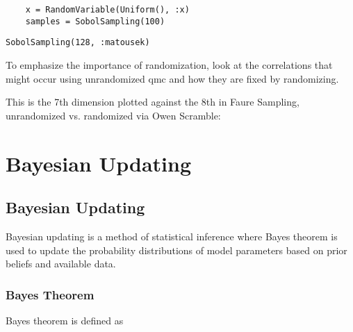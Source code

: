 \begin{verbatim}
    x = RandomVariable(Uniform(), :x)
    samples = SobolSampling(100)
\end{verbatim}


\begin{verbatim}
SobolSampling(128, :matousek)
\end{verbatim}



To emphasize the importance of randomization, look at the correlations that might occur using unrandomized qmc and how they are fixed by randomizing.



This is the 7th dimension plotted against the 8th in Faure Sampling, unrandomized vs. randomized via Owen Scramble:







\begin{figure}
\centering
\caption{}
\end{figure}




\chapter{Bayesian Updating}


\section{Bayesian Updating}



\label{16081037215275166927}{}


Bayesian updating is a method of statistical inference where Bayes{\textquotesingle} theorem is used to update the probability distributions of model parameters based on prior beliefs and available data.



\subsection{Bayes{\textquotesingle} Theorem}



\label{537349271097409493}{}


Bayes{\textquotesingle} theorem is defined as



